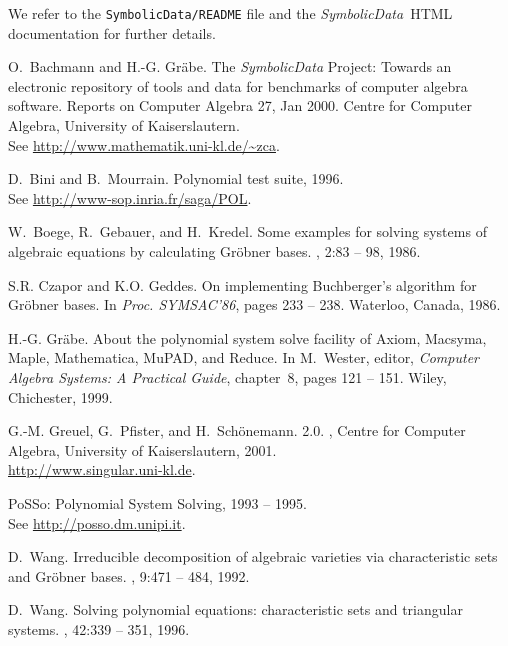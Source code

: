\documentclass[11pt]{article}
\newcommand{\SD}{{\em Symbo\-lic\-Data}}
\begin{document}
We refer to the {\tt SymbolicData/README} file and the \SD\ HTML
documentation for further details.


%
\begin{thebibliography}{1}

O.~Bachmann and H.-G. Gr\"{a}be.
\newblock The {{\it SymbolicData}} {P}roject: Towards an electronic repository
  of tools and data for benchmarks of computer algebra software.
\newblock Reports on Computer Algebra 27, Jan 2000.
\newblock Centre for Computer Algebra, University of Kaiserslautern.\\ See
  \url{http://www.mathematik.uni-kl.de/~zca}.

D.~Bini and B.~Mourrain.
\newblock Polynomial test suite, 1996.\\
\newblock See \url{http://www-sop.inria.fr/saga/POL}.

W.~Boege, R.~Gebauer, and H.~Kredel.
\newblock Some examples for solving systems of algebraic equations by
  calculating {Gr\"obner} bases.
, 2:83 -- 98, 1986.

S.R. Czapor and K.O. Geddes.
\newblock On implementing {B}uchberger's algorithm for {G}r\"obner bases.
\newblock In {\em Proc. SYMSAC'86}, pages 233 -- 238. Waterloo, Canada, 1986.

H.-G. Gr\"abe.
\newblock About the polynomial system solve facility of {Axiom, Macsyma, Maple,
  Mathematica, MuPAD, and Reduce}.
\newblock In M.~Wester, editor, {\em Computer Algebra Systems: A Practical
  Guide}, chapter~8, pages 121 -- 151. Wiley, Chichester, 1999.

G.-M. Greuel, G.~Pfister, and H.~Sch\"onemann.
 2.0.
, Centre for
  Computer Algebra, University of Kaiserslautern, 2001.\\
\newblock \url{http://www.singular.uni-kl.de}.

{PoSSo}: {Polynomial} {System} {Solving}, 1993 -- 1995.\\
\newblock See \url{http://posso.dm.unipi.it}.

D.~Wang.
\newblock Irreducible decomposition of algebraic varieties via characteristic
  sets and {G}r\"obner bases.
, 9:471 -- 484, 1992.

D.~Wang.
\newblock Solving polynomial equations: characteristic sets and triangular
  systems.
, 42:339 -- 351, 1996.

\end{thebibliography}
\end{document}
